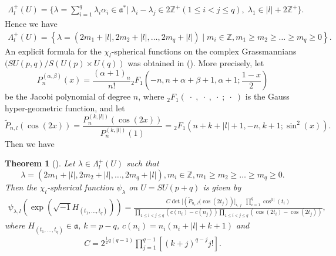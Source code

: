 \documentclass[11pt,a4paper]{amsart}
\newtheorem{theorem}{Theorem}[section]
\theoremstyle{definition}
\numberwithin{equation}{section}
\begin{document}
\begin{align*} 
\Lambda_l^+\left(U \right)=\Bigg\{\lambda= \sum_{i=1}^q \lambda_i\alpha_i \in \mathfrak{a}^*\Bigg|\;
\lambda_i - \lambda_j \in 2\mathbb{Z}^+(1\leq i< j \leq q),\; \lambda_1\in |l|+2\mathbb{Z}^+ \Bigg\}.
\end{align*}
Hence we have  
\begin{align}
\Lambda_l^+\left(U \right)=\left\lbrace\lambda= ( 2m_1+|l|, 2m_2+|l| , \dots , 2 m_q+|l|)\mid m_i\in \mathbb{Z} , m_1\geq m_2 \geq \dots \geq m_q\geq 0\right\}. \nonumber  \label{highest weight su(p,q)}
\end{align}
 An explicit formula for  the $\chi_l$-spherical functions on the complex Grassmannians $(SU(p,q)/S(U(p)\times U(q))$ was obtained in (\cite{Alhashami2}). More precisely, let $$P_n^{(\alpha, \beta)} (x) = \frac{(\alpha+1)_n}{n!} {}_2F_1\left( -n, n+\alpha+\beta+1, \alpha+1; \frac{1-x}{2}\right)$$ be  the  Jacobi polynomial of degree $n$,   where ${}_2F_1(\; \cdot\; ,\;\cdot\;,\; \cdot\; ;  \;\cdot\;  )$ is the Gauss hyper-geometric function, 
and let $$\tilde{P}_{n,l}\left(\cos(2x)\right)=\frac{P_n^{(k, |l|)} (\cos(2x))}{P_n^{(k,|l|)} (1)} = {}_2F_1\left(n+k+|l|+1,-n,k+1; \sin^2(x) \right).$$  Then we have    
\begin{theorem}[\cite{Alhashami2}]\label{Spherical function}
Let  $ \lambda\in \Lambda_l^+\left(U \right)$ such that  $$ \lambda= ( 2m_1+|l|, 2m_2+|l| , \dots , 2 m_q+|l|), m_i\in \mathbb{Z} , m_1\geq m_2 \geq \dots \geq m_q\geq 0.$$ Then the $\chi_l$-spherical function $\psi_\lambda$ on $U=SU(p+q)$
 is given by \begin{align*} 
\psi_{\lambda,l}\left(\exp \left(\sqrt{-1}H_{(t_1,\dots,t_q)}\right)\right)=  \frac{ \displaystyle C \det\bigg[\left( \tilde{P}_{n_i,l}(\cos(2t_j) \right) \bigg]_{i,\, j}\;\;\prod_{i=1}^q \cos^{|l|}(t_i) }{\displaystyle\prod_{1\leq i<j\leq q} (c(n_i)-c(n_j))\prod_{1\leq i<j\leq q}(\cos (2t_i)-\cos(2t_j))}  ,
\end{align*} where $H_{(t_1,\dots,t_q)}\in \mathfrak{a}$,  $k=p-q$, $c(n_i) = n_i(n_i+|l|+k+1)$  and 
\begin{align*}
 C=  2^{\frac{1 }{2} q(q-1)}\prod_{j=1}^{q-1}\left[(k+j)^{q-j}j!\right]   .\end{align*}
\end{theorem}
 
\end{document}
